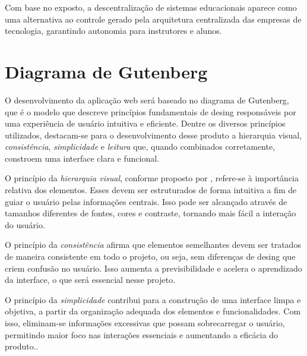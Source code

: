 Com base no exposto, a descentralização de sistemas educacionais aparece como uma alternativa ao controle gerado pela arquitetura centralizada das empresas de tecnologia, garantindo autonomia para instrutores e alunos.


\section{Diagrama de Gutenberg}

O desenvolvimento da aplicação web será baseado no diagrama de Gutenberg, que é o modelo que descreve princípios fundamentais de desing responsáveis por uma experiência de usuário intuitiva e eficiente. Dentre os diversos princípios utilizados, destacam-se para o desenvolvimento desse produto a {hierarquia visual}, \textit{consistência}, \textit{simplicidade} e \textit{leitura} que, quando combinados corretamente, constroem uma interface clara e funcional.

O princípio da \textit{hierarquia visual}, conforme proposto por \cite{lidwell2010}, refere-se à importância relativa dos elementos. Esses devem ser estruturados de forma intuitiva a fim de guiar o usuário pelas informações centrais. Isso pode ser alcançado através de tamanhos diferentes de fontes, cores  e contraste, tornando mais fácil a interação do usuário.

O princípio da \textit{consistência} afirma que elementos semelhantes devem ser tratados de maneira consistente em todo o projeto, ou seja, sem diferenças de desing que criem confusão no usuário. Isso aumenta a previsibilidade e acelera o aprendizado da interface, o que será essencial nesse projeto.

O princípio da \textit{simplicidade} contribui para a construção de uma interface limpa e objetiva, a partir da organização adequada dos elementos e funcionalidades. Com isso, eliminam-se informações excessivas que possam sobrecarregar o usuário, permitindo maior foco nas interações essenciais e aumentando a eficácia do produto..

